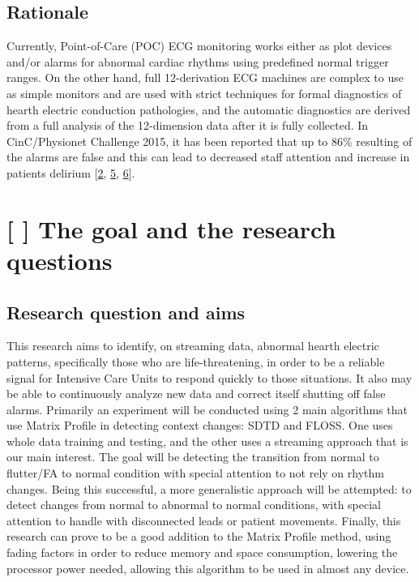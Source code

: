 \documentclass[runningheads]{llncs}
\begin{document}
\hypertarget{rationale}{%
\subsection{Rationale}\label{rationale}}

Currently, Point-of-Care (POC) ECG monitoring works either as plot
devices and/or alarms for abnormal cardiac rhythms using predefined
normal trigger ranges. On the other hand, full 12-derivation ECG
machines are complex to use as simple monitors and are used with strict
techniques for formal diagnostics of hearth electric conduction
pathologies, and the automatic diagnostics are derived from a full
analysis of the 12-dimension data after it is fully collected. In
CinC/Physionet Challenge 2015, it has been reported that up to 86\%
resulting of the alarms are false and this can lead to decreased staff
attention and increase in patients delirium
{[}\protect\hyperlink{ref-Chambrin2001}{2},
\protect\hyperlink{ref-Lawless1994}{5},
\protect\hyperlink{ref-Parthasarathy2004}{6}{]}.

\hypertarget{the-goal-and-the-research-questions}{%
\section{{[} {]} The goal and the research
questions}\label{the-goal-and-the-research-questions}}

\hypertarget{research-question-and-aims}{%
\subsection{Research question and
aims}\label{research-question-and-aims}}

This research aims to identify, on streaming data, abnormal hearth
electric patterns, specifically those who are life-threatening, in order
to be a reliable signal for Intensive Care Units to respond quickly to
those situations. It also may be able to continuously analyze new data
and correct itself shutting off false alarms. Primarily an experiment
will be conducted using 2 main algorithms that use Matrix Profile in
detecting context changes: SDTD and FLOSS. One uses whole data training
and testing, and the other uses a streaming approach that is our main
interest. The goal will be detecting the transition from normal to
flutter/FA to normal condition with special attention to not rely on
rhythm changes. Being this successful, a more generalistic approach will
be attempted: to detect changes from normal to abnormal to normal
conditions, with special attention to handle with disconnected leads or
patient movements. Finally, this research can prove to be a good
addition to the Matrix Profile method, using fading factors in order to
reduce memory and space consumption, lowering the processor power
needed, allowing this algorithm to be used in almost any device.
\end{document}
